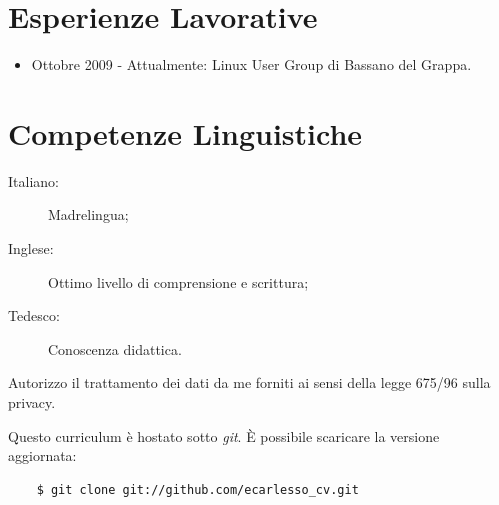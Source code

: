 \documentclass[pdftex, a4paper, 11pt]{article}
\begin{document}
\section*{Esperienze Lavorative}
\begin{itemize}
\item Ottobre 2009 - Attualmente: Linux User Group di Bassano del
  Grappa.
\end{itemize}

\section*{Competenze Linguistiche}
\begin{description}
\item[Italiano:] Madrelingua;
\item[Inglese:] Ottimo livello di comprensione e scrittura;
\item[Tedesco:] Conoscenza didattica.
\end{description}


\vfill

Autorizzo il trattamento dei dati da me forniti ai sensi della legge
675/96 sulla privacy.

\vspace{1cm}

\footnotesize {Questo curriculum \`e hostato sotto {\em git}. \`E possibile scaricare la versione aggiornata:}
\begin{verbatim}
    $ git clone git://github.com/ecarlesso_cv.git
\end{verbatim}
\end{document}
